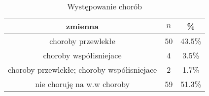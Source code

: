\begin{table}[H]
\caption{Występowanie chorób}
\centering
\begin{tabular}{ | c | c | c |}
\hline
zmienna & $n$ & \% \\
\hline
choroby przewlekłe  &  50  & 43.5\% \\
\hline
choroby współisniejace  &  4  & 3.5\% \\
\hline
choroby przewlekłe; choroby współisniejace  &  2  & 1.7\% \\
\hline
nie choruję na w.w choroby  &  59  & 51.3\% \\
\hline
\end{tabular}
\label{tab:Q33}
\end{table}
